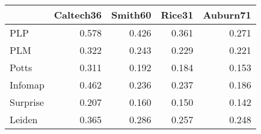 \begin{tabular}{lrrrr}
\toprule
{} & Caltech36 & Smith60 & Rice31 & Auburn71 \\
\midrule
PLP      &     0.578 &   0.426 &  0.361 &    0.271 \\
PLM      &     0.322 &   0.243 &  0.229 &    0.221 \\
Potts    &     0.311 &   0.192 &  0.184 &    0.153 \\
Infomap  &     0.462 &   0.236 &  0.237 &    0.186 \\
Surprise &     0.207 &   0.160 &  0.150 &    0.142 \\
Leiden   &     0.365 &   0.286 &  0.257 &    0.248 \\
\bottomrule
\end{tabular}
